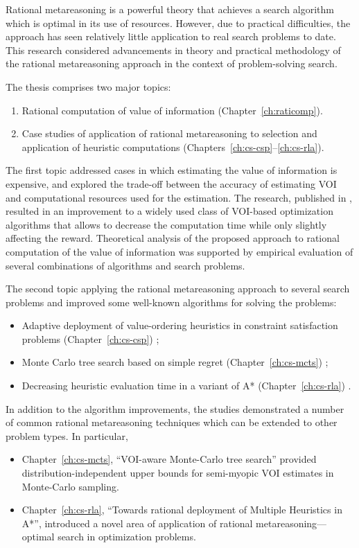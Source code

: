 Rational metareasoning is a powerful theory that achieves a search
algorithm which is optimal in its use of resources. However, due to
practical difficulties, the approach has seen relatively little
application to real search problems to date. This research considered
advancements in theory and practical methodology of the rational
metareasoning approach in the context of problem-solving search.

The thesis comprises two major topics:
\begin {enumerate}
\item Rational computation of value of information (Chapter~\ref{ch:raticomp}).
\item Case studies of application of rational metareasoning to
  selection and application of heuristic computations
  (Chapters~\ref{ch:cs-csp}--\ref{ch:cs-rla}). 
\end {enumerate}

The first topic addressed cases in which estimating the value of
information is expensive, and explored the trade-off between the
accuracy of estimating VOI and computational resources used for the
estimation. The research, published in \cite{TolpinShimony.raticomp},
resulted in an improvement to a widely used class of VOI-based
optimization algorithms that allows to decrease the computation time
while only slightly affecting the reward. Theoretical analysis of the
proposed approach to rational computation of the value of information
was supported by empirical evaluation of several combinations of
algorithms and search problems.

The second topic applying the rational metareasoning approach to
several search problems and improved some well-known algorithms for
solving the problems: 
\begin {itemize}
\item Adaptive deployment of value-ordering heuristics in constraint
  satisfaction problems (Chapter~\ref{ch:cs-csp}) \cite{TolpinShimony.csp};
\item Monte Carlo tree search based on simple regret
  (Chapter~\ref{ch:cs-mcts})
  \cite{TolpinShimony.mcts,HayRussellTolpinShimony.selecting}; 
\item Decreasing heuristic evaluation time in a variant of A*
  (Chapter~\ref{ch:cs-rla}) \cite{TolpinEtAl.rla}. 
\end {itemize}
In addition to the algorithm improvements, the studies demonstrated a
number of common rational metareasoning techniques which can be 
extended to other problem types. In particular,
\begin{itemize}
\item Chapter~\ref{ch:cs-mcts}, ``VOI-aware Monte-Carlo tree search''
provided distribution-independent upper bounds for semi-myopic VOI
estimates in Monte-Carlo sampling.
\item Chapter~\ref{ch:cs-rla}, ``Towards rational deployment of Multiple
Heuristics in A*'', introduced a novel area of application of rational
metareasoning---optimal search in optimization problems.
\end{itemize}

